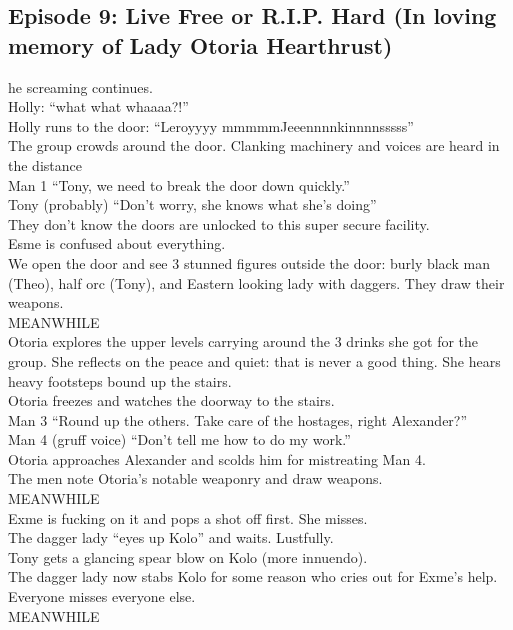 \subsection{Episode 9: Live Free or R.I.P. Hard (In loving memory of Lady Otoria Hearthrust)}
he screaming continues.\\
Holly: “what what whaaaa?!”\\
Holly runs to the door: “Leroyyyy mmmmmJeeennnnkinnnnsssss”\\
The group crowds around the door. Clanking machinery and voices are heard in the distance\\
Man 1 “Tony, we need to break the door down quickly.”\\
Tony (probably) “Don’t worry, she knows what she’s doing”\\
They don’t know the doors are unlocked to this super secure facility.\\
Esme is confused about everything.\\
We open the door and see 3 stunned figures outside the door: burly black man (Theo), half orc (Tony), and Eastern looking lady with daggers. They draw their weapons.\\
MEANWHILE\\
Otoria explores the upper levels carrying around the 3 drinks she got for the group. She reflects on the peace and quiet: that is never a good thing. She hears heavy footsteps bound up the stairs.\\
Otoria freezes and watches the doorway to the stairs.\\
Man 3 “Round up the others. Take care of the hostages, right Alexander?”\\
Man 4 (gruff voice) “Don’t tell me how to do my work.”\\
Otoria approaches Alexander and scolds him for mistreating Man 4.\\
The men note Otoria’s notable weaponry and draw weapons.\\
MEANWHILE\\
Exme is fucking on it and pops a shot off first. She misses.\\
The dagger lady “eyes up Kolo” and waits. Lustfully.\\
Tony gets a glancing spear blow on Kolo (more innuendo).\\
The dagger lady now stabs Kolo for some reason who cries out for Exme’s help.\\
Everyone misses everyone else.\\
MEANWHILE\\
